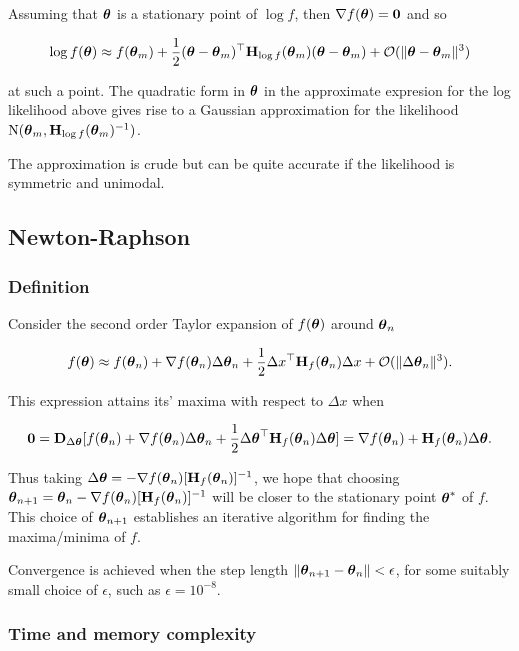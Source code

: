 \documentclass{article}[12pt]
\begin{document}
Assuming that ${\boldsymbol \theta}$ is a stationary point of $\log f$, then $\nabla f({\boldsymbol \theta}) = {\bf 0}$ and so

$$
\log f({\boldsymbol \theta}) \approx f({\boldsymbol \theta}_m) + {\frac{1}{2}} ({\boldsymbol \theta} - {\boldsymbol \theta}_m)^\top {\bf H}_{\log f}({\boldsymbol \theta}_m) ({\boldsymbol \theta} - {\boldsymbol \theta}_m) + {\mathcal O}(\| {\boldsymbol \theta} - {\boldsymbol \theta}_m \|^3)
$$

at such a point. The quadratic form in ${\boldsymbol \theta}$ in the approximate expresion for the log likelihood above gives 
rise to a Gaussian approximation for the likelihood $\text{N}({\boldsymbol \theta}_m, {\bf H}_{\log f}({\boldsymbol \theta}_m)^{-1})$.

The approximation is crude but can be quite accurate if the likelihood is symmetric and unimodal.

\subsection{Newton-Raphson}

\subsubsection{Definition}

Consider the second order Taylor expansion of $f({\boldsymbol \theta})$ around ${\boldsymbol \theta}_{n}$

$$
f({\boldsymbol \theta}) \approx f({\boldsymbol \theta}_{n}) + \nabla f({\boldsymbol \theta}_{n}) \Delta {\boldsymbol\theta}_{n} + {\frac{1}{2}} \Delta x^\top {\bf H}_f({\boldsymbol \theta}_{n}) \Delta x + {\mathcal O}(\| \Delta {\boldsymbol\theta}_{n} \|^3).
$$

This expression attains its' maxima with respect to $\Delta x$ when

$$
{\bf 0} = {\bf D}_{\Delta {\boldsymbol\theta}} [f({\boldsymbol \theta}_{n}) + \nabla f({\boldsymbol \theta}_{n}) \Delta {\boldsymbol\theta}_{n} + {\frac{1}{2}} \Delta {\boldsymbol\theta}^\top {\bf H}_f({\boldsymbol \theta}_{n}) \Delta {\boldsymbol\theta}] = \nabla f({\boldsymbol \theta}_n) + {\bf H}_f({\boldsymbol \theta}_n) \Delta {\boldsymbol\theta}.
$$

Thus taking $\Delta {\boldsymbol\theta} = -\nabla f({\boldsymbol \theta}_n) [{\bf H}_f({\boldsymbol \theta}_n)]^{-1}$, we hope that choosing
${\boldsymbol \theta}_{n + 1} = {\boldsymbol \theta}_{n} - \nabla f({\boldsymbol \theta}_n) [{\bf H}_f({\boldsymbol \theta}_n)]^{-1}$ will be closer to the stationary 
point ${\boldsymbol \theta}^*$ of $f$. This choice of ${\boldsymbol \theta}_{n+1}$ establishes an iterative algorithm for finding the 
maxima/minima of $f$.

Convergence is achieved when the step length $\| {\boldsymbol \theta}_{n+1} - {\boldsymbol \theta}_{n} \| < \epsilon$, for some
suitably small choice of $\epsilon$, such as $\epsilon = 10^{-8}$.

\subsubsection{Time and memory complexity}
\end{document}
